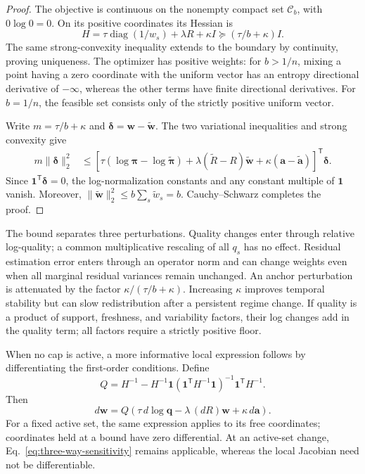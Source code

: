 \begin{proof}
The objective is continuous on the nonempty compact set $\mathcal C_b$, with
$0\log0=0$. On its positive coordinates its Hessian is
\begin{equation}
 H=\tau\operatorname{diag}(1/w_s)+\lambda R+\kappa I
 \succeq(\tau/b+\kappa)I.
\end{equation}
The same strong-convexity inequality extends to the boundary by continuity,
proving uniqueness. The optimizer has positive weights: for $b>1/n$, mixing
a point having a zero coordinate with the uniform vector has an entropy
directional derivative of $-\infty$, whereas the other terms have finite
directional derivatives. For $b=1/n$, the feasible set consists only of the
strictly positive uniform vector.

Write $m=\tau/b+\kappa$ and
$\boldsymbol\delta=\boldsymbol w-\widetilde{\boldsymbol w}$.
The two variational inequalities and strong convexity give
\begin{align}
 m\|\boldsymbol\delta\|_2^2
 &\le
 \left[
  \tau(\log\boldsymbol\pi-\log\widetilde{\boldsymbol\pi})
  +\lambda(\widetilde R-R)\widetilde{\boldsymbol w}
  +\kappa(\boldsymbol a-\widetilde{\boldsymbol a})
 \right]^{\mathsf T}\boldsymbol\delta.
\end{align}
Since $\boldsymbol1^{\mathsf T}\boldsymbol\delta=0$, the log-normalization
constants and any constant multiple of $\boldsymbol1$ vanish. Moreover,
$\|\widetilde{\boldsymbol w}\|_2^2\le b\sum_s\widetilde w_s=b$.
Cauchy--Schwarz completes the proof.
\end{proof}

The bound separates three perturbations. Quality changes enter through
relative log-quality; a common multiplicative rescaling of all $q_s$ has no
effect. Residual estimation error enters through an operator norm and can
change weights even when all marginal residual variances remain unchanged.
An anchor perturbation is attenuated by the factor
$\kappa/(\tau/b+\kappa)$. Increasing $\kappa$ improves temporal stability but
can slow redistribution after a persistent regime change. If quality is a
product of support, freshness, and variability factors, their log changes
add in the quality term; all factors require a strictly positive floor.

When no cap is active, a more informative local expression follows by
differentiating the first-order conditions. Define
\begin{equation}
 Q=H^{-1}-H^{-1}\boldsymbol1
 (\boldsymbol1^{\mathsf T}H^{-1}\boldsymbol1)^{-1}
 \boldsymbol1^{\mathsf T}H^{-1}.
\end{equation}
Then
\begin{equation}
 d\boldsymbol w
 =Q\left(\tau\,d\log\boldsymbol q
         -\lambda\,(dR)\boldsymbol w
         +\kappa\,d\boldsymbol a\right).
 \label{eq:local-sensitivity}
\end{equation}
For a fixed active set, the same expression applies to its free coordinates;
coordinates held at a bound have zero differential. At an active-set change,
Eq.~\eqref{eq:three-way-sensitivity} remains applicable, whereas the local
Jacobian need not be differentiable.

